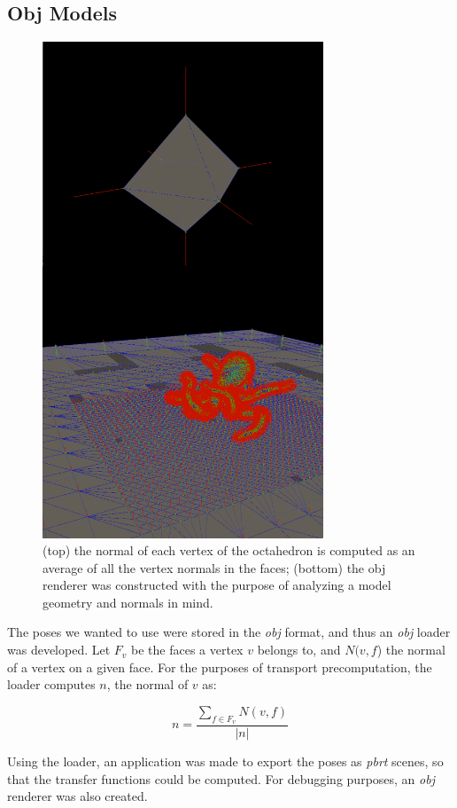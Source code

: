 \documentclass[annual]{acmsiggraph}
\begin{document}
\subsection{Obj Models}
\begin{figure}[t!]
  \centering
  \includegraphics[width=3.3in]{images/obj.png}
  \caption{(top) the normal of each vertex of the octahedron is computed as an average of all the vertex normals in the faces; (bottom) the obj renderer was constructed with the purpose of analyzing a model geometry and normals in mind.}
\end{figure}

The poses we wanted to use were stored in the \emph{obj} format, and thus an \emph{obj} loader was developed. Let $F_{v}$ be the faces a vertex $v$ belongs to, and $N(v, f$) the normal of a vertex on a given face. For the purposes of transport precomputation, the loader computes $n$, the normal of $v$ as:

\begin{equation}
	n = \frac {\sum _{f \in F_{v}}^{} N(v, f)} {|n|}
\end{equation}

Using the loader, an application was made to export the poses as \emph{pbrt} scenes, so that the transfer functions could be computed. For debugging purposes, an \emph{obj} renderer was also created.
\end{document}
